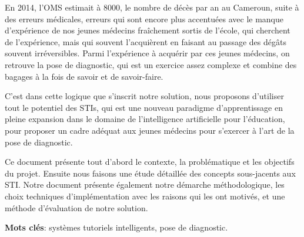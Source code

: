 
En 2014, l’OMS estimait à 8000, le nombre de décès par an au Cameroun, suite à des erreurs médicales, erreurs qui sont encore plus accentuées avec le manque d'expérience de nos jeunes médecins fraîchement sortis de l'école, qui cherchent de l'expérience, mais qui souvent l'acquièrent en faisant au passage des dégâts souvent irréversibles. Parmi l'expérience à acquérir par ces jeunes médecins, on retrouve la pose de diagnostic, qui est un exercice assez complexe et combine des bagages à la fois de savoir et de savoir-faire.

C'est dans cette logique que s'inscrit notre solution, nous proposons d'utiliser tout le potentiel des STIs, qui est une nouveau paradigme d'apprentissage en pleine expansion dans le domaine de l'intelligence artificielle pour l'éducation, pour proposer un cadre adéquat aux jeunes médecins pour s'exercer à l'art de la pose de diagnostic. 

Ce document présente tout d'abord le contexte, la problématique et les objectifs du projet. Ensuite nous faisons une étude détaillée des concepts sous-jacents aux STI. Notre document présente également notre démarche méthodologique, les choix techniques d'implémentation avec les raisons qui les ont motivés, et une méthode d'évaluation de notre solution.

\textbf{Mots clés}: systèmes tutoriels intelligents, pose de diagnostic.